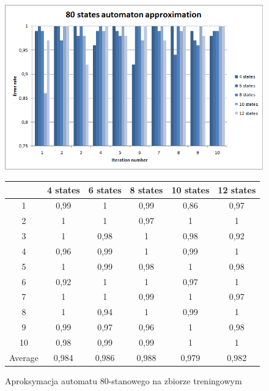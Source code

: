 \documentclass[runningheads,a4paper]{llncs}
\begin{document}
\begin{figure}[!htb]
\includegraphics[scale=0.92]{10.png}
\endminipage\hfill
\hspace{2.2cm}
\renewcommand{\arraystretch}{1.3}%
\begin{tabular}{@{}cccccc@{}}
\toprule
        & 4 states & 6 states & 8 states & 10 states & 12 states    \\ \midrule
1       & 0,99     & 1        & 0,99     & 0,86      & 0,97 \\
2       & 1        & 1        & 0,97     & 1         & 1 \\
3       & 1        & 0,98     & 1        & 0,98      & 0,92 \\
4       & 0,96     & 0,99     & 1        & 0,99      & 1   \\
5       & 1        & 0,99     & 0,98     & 1         & 0,98   \\
6       & 0,92     & 1        & 1        & 0,97      & 1    \\
7       & 1        & 1        & 0,99     & 1         & 0,97    \\
8       & 1        & 0,94     & 1        & 0,99      & 1    \\
9       & 0,99     & 0,97     & 0,96     & 1         & 0,98 \\
10      & 0,98     & 0,99     & 0,99     & 1         & 1  \\ \bottomrule
Average & 0,984    & 0,986    & 0,988    & 0,979     & 0,982  \\ \bottomrule
\end{tabular}
\vspace{4mm}
\endminipage\hfill
\caption{Aproksymacja automatu 80-stanowego na zbiorze treningowym}
\end{figure}
\end{document}
